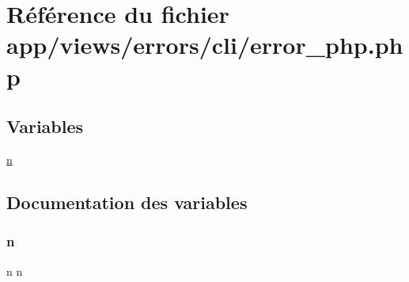 \hypertarget{cli_2error__php_8php}{}\section{Référence du fichier app/views/errors/cli/error\+\_\+php.php}
\label{cli_2error__php_8php}
\subsection*{Variables}
\begin{DoxyCompactItemize}
\item 
\hyperlink{cli_2error__php_8php_a2e6b16bbc42094e4c51ade3c10afdcf1}{n}
\end{DoxyCompactItemize}


\subsection{Documentation des variables}
\mbox{\label{cli_2error__php_8php_a2e6b16bbc42094e4c51ade3c10afdcf1}} 
\subsubsection{\texorpdfstring{n}{n}}
{\footnotesize\ttfamily n n}

